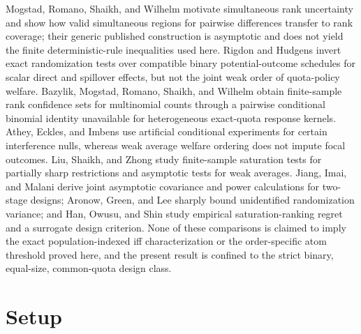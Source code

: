 \documentclass{article}
\begin{document}
Mogstad, Romano, Shaikh, and Wilhelm motivate simultaneous rank uncertainty and show how valid simultaneous regions for pairwise differences transfer to rank coverage; their generic published construction is asymptotic and does not yield the finite deterministic-rule inequalities used here. Rigdon and Hudgens invert exact randomization tests over compatible binary potential-outcome schedules for scalar direct and spillover effects, but not the joint weak order of quota-policy welfare. Bazylik, Mogstad, Romano, Shaikh, and Wilhelm obtain finite-sample rank confidence sets for multinomial counts through a pairwise conditional binomial identity unavailable for heterogeneous exact-quota response kernels. Athey, Eckles, and Imbens use artificial conditional experiments for certain interference nulls, whereas weak average welfare ordering does not impute focal outcomes. Liu, Shaikh, and Zhong study finite-sample saturation tests for partially sharp restrictions and asymptotic tests for weak averages. Jiang, Imai, and Malani derive joint asymptotic covariance and power calculations for two-stage designs; Aronow, Green, and Lee sharply bound unidentified randomization variance; and Han, Owusu, and Shin study empirical saturation-ranking regret and a surrogate design criterion. None of these comparisons is claimed to imply the exact population-indexed iff characterization or the order-specific atom threshold proved here, and the present result is confined to the strict binary, equal-size, common-quota design class.

\section{Setup}
\end{document}
